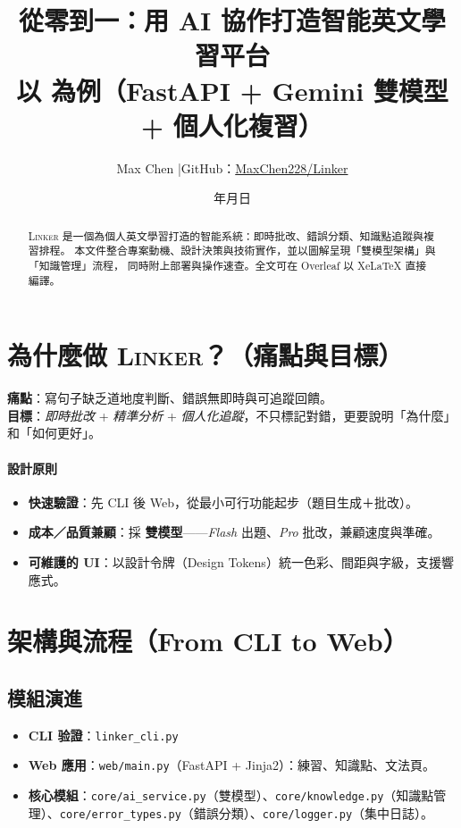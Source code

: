 \documentclass[12pt,a4paper]{article}
\date{\the\year 年\the\month 月\the\day 日}
\title{\textbf{從零到一：用 AI 協作打造智能英文學習平台}\\
\large 以 \Product{} 為例（FastAPI + Gemini 雙模型 + 個人化複習）}
\author{Max Chen \quad|\quad GitHub：\href{https://github.com/MaxChen228/Linker}{MaxChen228/Linker}}
\newcommand{\Product}{\textsc{Linker}}
\newcommand{\code}[1]{\texttt{#1}}
\begin{document}
\maketitle

\begin{abstract}
\Product{} 是一個為個人英文學習打造的智能系統：即時批改、錯誤分類、知識點追蹤與複習排程。
本文件整合專案動機、設計決策與技術實作，並以圖解呈現「雙模型架構」與「知識管理」流程，
同時附上部署與操作速查。全文可在 Overleaf 以 XeLaTeX 直接編譯。
\end{abstract}

\tableofcontents
\bigskip

\section{為什麼做 \Product{}？（痛點與目標）}
\begin{tcolorbox}
\textbf{痛點}：寫句子缺乏道地度判斷、錯誤無即時與可追蹤回饋。\\
\textbf{目標}：\emph{即時批改} + \emph{精準分析} + \emph{個人化追蹤}，不只標記對錯，更要說明「為什麼」和「如何更好」。
\end{tcolorbox}

\paragraph{設計原則}
\begin{itemize}
  \item \textbf{快速驗證}：先 CLI 後 Web，從最小可行功能起步（題目生成＋批改）。
  \item \textbf{成本／品質兼顧}：採 \textbf{雙模型}——\emph{Flash} 出題、\emph{Pro} 批改，兼顧速度與準確。
  \item \textbf{可維護的 UI}：以設計令牌（Design Tokens）統一色彩、間距與字級，支援響應式。
\end{itemize}

\section{架構與流程（From CLI to Web）}
\subsection{模組演進}
\begin{itemize}
  \item \textbf{CLI 验證}：\code{linker\_cli.py}
  \item \textbf{Web 應用}：\code{web/main.py}（FastAPI + Jinja2）：練習、知識點、文法頁。
  \item \textbf{核心模組}：\code{core/ai\_service.py}（雙模型）、\code{core/knowledge.py}（知識點管理）、\code{core/error\_types.py}（錯誤分類）、\code{core/logger.py}（集中日誌）。
\end{itemize}
\end{document}

